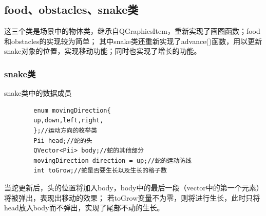 \documentclass[utf-8]{ctexart}
\begin{document}
    \subsection{food、obstacles、snake类}
    这三个类是场景中的物体类，继承自QGraphicsItem，重新实现了画图函数；food和obstacles的实现较为简单；
    其中snake类还重新实现了advance()函数，用以更新snake对象的位置，实现移动功能；同时也实现了增长的功能。
    \subsubsection{snake类}
    snake类中的数据成员
    \begin{lstlisting}
        enum movingDirection{
        up,down,left,right,
        };//运动方向的枚举类
        Pii head;//蛇的头
        QVector<Pii> body;//蛇的其他部分
        movingDirection direction = up;//蛇的运动防线
        int toGrow;//蛇是否要生长以及生长的格子数
    \end{lstlisting}
    当蛇更新后，头的位置将加入body，body中的最后一段（vector中的第一个元素）将被弹出，表现出移动的效果；
    若toGrow变量不为零，则将进行生长，此时只将head放入body而不弹出，实现了尾部不动的生长。
\end{document}
